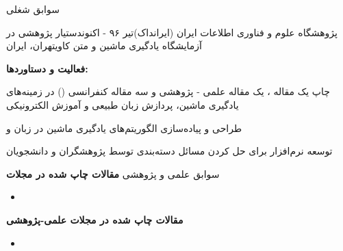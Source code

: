 \documentclass{resume} %
\begin{document}
\begin{rSection}{سوابق شغلی}
\def\jobtitle{دستیار پژوهشی در آزمایشگاه یادگیری ماشین و متن کاوی}
\def\employername{پژوهشگاه علوم و فناوری اطلاعات ایران (ایرانداک)}
\def\years{تیر ۹۶ - اکنون}
\def\location{تهران، ایران}

\begin{rSubsection}{\employername}{\years}{\jobtitle}{\location}

\textbf{فعالیت و دستاوردها:}
\item چاپ یک مقاله ، یک مقاله علمی - پژوهشی و سه مقاله کنفرانسی () در زمینه‌های یادگیری ماشین، پردازش زبان طبیعی و آموزش الکترونیکی
\item طراحی و پیاده‌سازی الگوریتم‌های یادگیری ماشین در زبان  و 
\item توسعه نرم‌افزار  برای حل کردن مسائل دسته‌بندی توسط پژوهشگران و دانشجویان

\end{rSubsection}

%
\end{rSection}
%
\begin{rSection}{سوابق علمی و پژوهشی}
\small\textbf{مقالات چاپ شده در مجلات }
\begin{latin}
\begin{itemize}
	\item {}
\end{itemize}
\end{latin}

\small\textbf{مقالات چاپ شده در مجلات علمی-پژوهشی}
\begin{itemize}
	\item {}
\end{itemize}

%
\end{rSection}
\end{document}
